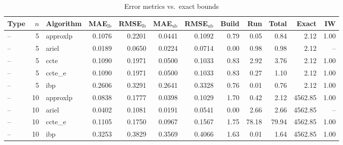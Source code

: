 \begin{table}[ht]
\centering
\scriptsize
\caption{Error metrics vs.\ exact bounds}
\begin{tabular}{lrlrrrrrrrrr}
\toprule
Type & $n$ & Algorithm & MAE$_{\text{lb}}$ & RMSE$_{\text{lb}}$ & MAE$_{\text{ub}}$ & RMSE$_{\text{ub}}$ & Build & Run & Total & Exact & IW \\
\midrule
-- & 5 & approxlp & 0.1076 & 0.2201 & 0.0441 & 0.1092 & 0.79 & 0.05 & 0.84 & 2.12 & 1.00 \\
-- & 5 & ariel & 0.0189 & 0.0650 & 0.0224 & 0.0714 & 0.00 & 0.98 & 0.98 & 2.12 & -- \\
-- & 5 & ccte & 0.1090 & 0.1971 & 0.0500 & 0.1033 & 0.83 & 2.92 & 3.76 & 2.12 & 1.00 \\
-- & 5 & ccte_e & 0.1090 & 0.1971 & 0.0500 & 0.1033 & 0.83 & 0.27 & 1.10 & 2.12 & 1.00 \\
-- & 5 & ibp & 0.2606 & 0.3291 & 0.2641 & 0.3328 & 0.76 & 0.01 & 0.76 & 2.12 & 1.00 \\
-- & 10 & approxlp & 0.0838 & 0.1777 & 0.0398 & 0.1029 & 1.70 & 0.42 & 2.12 & 4562.85 & 1.00 \\
-- & 10 & ariel & 0.0402 & 0.1081 & 0.0191 & 0.0541 & 0.00 & 2.66 & 2.66 & 4562.85 & -- \\
-- & 10 & ccte_e & 0.1105 & 0.1750 & 0.0967 & 0.1567 & 1.75 & 78.18 & 79.94 & 4562.85 & 1.00 \\
-- & 10 & ibp & 0.3253 & 0.3829 & 0.3569 & 0.4066 & 1.63 & 0.01 & 1.64 & 4562.85 & 1.00 \\
\bottomrule
\end{tabular}
\end{table}
